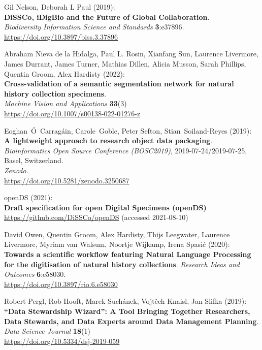 \begin{thebibliography}{9}
Gil Nelson, Deborah L Paul (2019):\\
\textbf{DiSSCo, iDigBio and the Future of Global Collaboration}.\\
\emph{Biodiversity Information Science and Standards}
\textbf{3}:e37896.\\
\url{https://doi.org/10.3897/biss.3.37896}

Abraham Nieva de la Hidalga, Paul L. Rosin, Xianfang Sun, Laurence Livermore, James Durrant, James Turner, Mathias Dillen, Alicia Musson, Sarah Phillips, Quentin Groom, Alex Hardisty (2022):\\
\textbf{Cross-validation of a semantic segmentation network for natural history collection specimens}.\\
\emph{Machine Vision and Applications} \textbf{33}(3)\\
\url{https://doi.org/10.1007/s00138-022-01276-z}

Eoghan~Ó~Carragáin, Carole~Goble, Peter Sefton,
Stian~Soiland-Reyes (2019):\\
\textbf{A lightweight approach to research object data packaging}.\\
\emph{Bioinformatics Open Source Conference (BOSC2019)},
2019-07-24/2019-07-25, Basel, Switzerland.\\
\emph{Zenodo}.\\
\url{https://doi.org/10.5281/zenodo.3250687}

openDS (2021):\\
\textbf{Draft specification for open Digital Specimens (openDS)}
\url{https://github.com/DiSSCo/openDS} (accessed 2021-08-10)

David Owen, Quentin Groom, Alex Hardisty, Thijs Leegwater, Laurence Livermore, Myriam van Walsum, Noortje Wijkamp, Irena Spasić (2020):\\
\textbf{Towards a scientific workflow featuring Natural
Language Processing for the digitisation of natural history collections}.
\emph{Research Ideas and Outcomes} \textbf{6}:e58030.\\
\url{https://doi.org/10.3897/rio.6.e58030}

Robert Pergl, Rob Hooft, Marek Suchánek, Vojtěch
Knaisl, Jan Slifka (2019):\\
\textbf{``Data Stewardship Wizard'': A Tool Bringing Together
Researchers, Data Stewards, and Data Experts around Data Management
Planning}.\\
\emph{Data Science Journal} \textbf{18}(1)\\
\url{https://doi.org/10.5334/dsj-2019-059}


\end{thebibliography}
